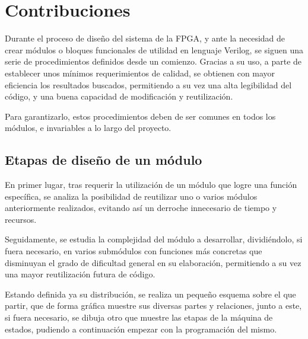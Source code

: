 \chapter{Contribuciones}
\label{ch:contribuciones}

Durante el proceso de diseño del sistema de la FPGA, y ante la necesidad de crear módulos o bloques funcionales de utilidad en lenguaje Verilog\cite{stuartsutherland2001}, se siguen una serie de procedimientos definidos desde un comienzo. Gracias a su uso, a parte de establecer unos mínimos requerimientos de calidad, se obtienen con mayor eficiencia los resultados buscados, permitiendo a su vez una alta legibilidad del código, y una buena capacidad de modificación y reutilización.

Para garantizarlo, estos procedimientos deben de ser comunes en todos los módulos, e invariables a lo largo del proyecto.



\section{Etapas de diseño de un módulo}
\label{ch:contribuciones:etapas}
En primer lugar, tras requerir la utilización de un módulo que logre una función específica, se analiza la posibilidad de reutilizar uno o varios módulos anteriormente realizados, evitando así un derroche innecesario de tiempo y recursos.

Seguidamente, se estudia la complejidad del módulo a desarrollar, dividiéndolo, si fuera necesario, en varios submódulos con funciones más concretas que disminuyan el grado de dificultad general en su elaboración, permitiendo a su vez una mayor reutilización futura de código.

Estando definida ya su distribución, se realiza un pequeño esquema sobre el que partir, que de forma gráfica muestre sus diversas partes y relaciones, junto a este, si fuera necesario, se dibuja otro que muestre las etapas de la máquina de estados, pudiendo a continuación empezar con la programación del mismo.

